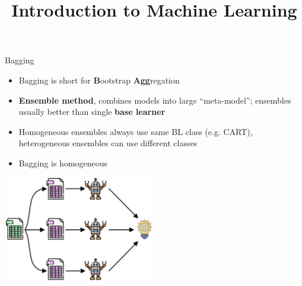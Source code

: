 \documentclass[11pt,compress,t,notes=noshow, xcolor=table]{beamer}
\title{Introduction to Machine Learning}
\begin{document}

\begin{vbframe}{Bagging}

\begin{itemize}
  \item Bagging is short for \textbf{B}ootstrap \textbf{Agg}regation
  \item \textbf{Ensemble method}, combines models into large \enquote{meta-model};
    ensembles usually better than single \textbf{base learner}
  \item Homogeneous ensembles always use same BL class (e.g. CART),
    heterogeneous ensembles can use different classes
  \item Bagging is homogeneous

\end{itemize}
\begin{center}
\includegraphics[width=0.5\textwidth]{figure_man/bagging.png}
\end{center}

\end{vbframe}
\end{document}
